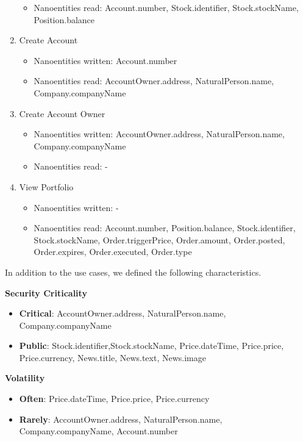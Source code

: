 \begin{enumerate}
\begin{itemize}
	\item Nanoentities read: Account.number, Stock.identifier, Stock.stockName, Position.balance
	\end{itemize}
\item Create Account
	\begin{itemize}
	\item Nanoentities written: Account.number
	\item Nanoentities read: AccountOwner.address, NaturalPerson.name, Company.companyName
	\end{itemize}
\item Create Account Owner
	\begin{itemize}
	\item Nanoentities written: AccountOwner.address, NaturalPerson.name, Company.companyName
	\item Nanoentities read: -
	\end{itemize}
\item View Portfolio
	\begin{itemize}
	\item Nanoentities written: -
	\item Nanoentities read: Account.number, Position.balance, Stock.identifier, Stock.stockName, Order.triggerPrice, Order.amount, Order.posted, Order.expires, Order.executed, Order.type
	\end{itemize}
\end{enumerate}

In addition to the use cases, we defined the following characteristics.

\textbf{Security Criticality}

\begin{itemize}
\item \textbf{Critical}: AccountOwner.address, NaturalPerson.name, Company.companyName
\item \textbf{Public}: Stock.identifier,Stock.stockName, Price.dateTime, Price.price, Price.currency, News.title, News.text, News.image
\end{itemize} 

\textbf{Volatility}

\begin{itemize}
\item \textbf{Often}: Price.dateTime, Price.price, Price.currency
\item \textbf{Rarely}: AccountOwner.address, NaturalPerson.name, Company.companyName, Account.number
\end{itemize}

